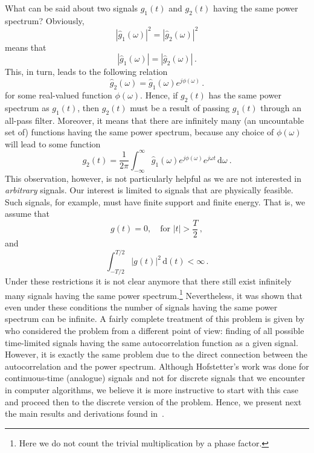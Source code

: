 What can be said about two signals $g_{1}(t)$ and $g_{2}(t)$ having
the same power spectrum? Obviously,
\begin{equation}
  \label{eq:28}
  |\hat{g}_{1}(\omega)|^{2} = |\hat{g}_{2}(\omega)|^{2}
\end{equation}
means that
\begin{equation}
  \label{eq:29}
  |\hat{g}_{1}(\omega)| = |\hat{g}_{2}(\omega)|\,.
\end{equation}
This, in turn, leads to the following relation
\begin{equation}
  \label{eq:30}
  \hat{g}_{2}(\omega) = \hat{g}_{1}(\omega)e^{j\phi(\omega)}\,.
\end{equation}
for some real-valued function $\phi(\omega)$. Hence, if $g_{2}(t)$ has
the same power spectrum as $g_{1}(t)$, then $g_{2}(t)$ must be a
result of passing $g_{1}(t)$ through an all-pass filter. Moreover, it
means that there are infinitely many (an uncountable set of) functions
having the same power spectrum, because any choice of $\phi(\omega)$ will
lead to some function
\begin{equation}
  \label{eq:31}
  g_{2}(t) =
  \frac{1}{2\pi}\int_{-\infty}^{\infty}\hat{g}_{1}(\omega)e^{j\phi(\omega)}
  e^{j\omega t}\, \mathrm{d} \omega \ .
\end{equation}
This observation, however, is not particularly helpful as we are not
interested in \textit{arbitrary} signals. Our interest is limited to
signals that are physically feasible. Such signals, for example,
must have finite support and finite energy. That is, we assume that
\begin{equation}
  \label{eq:7}
  g(t) = 0, \quad \text{for } |t|> \frac{T}{2}\,,
\end{equation}
and
\begin{equation}
  \label{eq:10}
  \int^{T/2}_{-T/2}|g(t)|^{2}\,\mathrm{d}(t) < \infty \,. 
\end{equation}
Under these restrictions it is not clear anymore that there still exist
infinitely many signals having the same power spectrum.\footnote{Here
  we do not count the trivial multiplication by a phase factor.} Nevertheless,
it was shown that even under these conditions the number of signals
having the same power spectrum can be infinite. A fairly complete
treatment of this problem is given
by~ who considered the problem from a
different point of view: finding of all possible time-limited signals
having the same autocorrelation function as a given signal. However,
it is exactly the same problem due to the direct connection between
the autocorrelation and the power spectrum.  Although Hofstetter's
work was done for continuous-time (analogue) signals and not for
discrete signals that we encounter in computer algorithms, we believe it is
more instructive to start with this case and proceed then to the
discrete version of the problem. Hence, we present next the main
results and derivations found in~.

